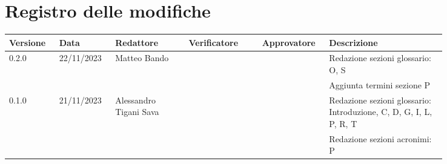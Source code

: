 \section*{Registro delle modifiche}
{
\renewcommand{\arraystretch}{1.5}
\scriptsize
\begin{longtable}{p{0.10\linewidth}p{0.10\linewidth}p{0.15\linewidth}p{0.15\linewidth}p{0.10\linewidth}p{0.24\linewidth}}
	\textbf{Versione} & \textbf{Data} & \textbf{Redattore}     & \textbf{Verificatore} & \textbf{Approvatore} & \textbf{Descrizione}	\\
	\toprule
	0.2.0	& 22/11/2023    & Matteo Bando			&	&	& Redazione sezioni glossario: O, S	\\
	&               &						&	&	& Aggiunta termini sezione P		\\
	\hline
	0.1.0	& 21/11/2023    & Alessandro Tigani Sava &	&	& Redazione sezioni glossario: Introduzione, C, D, G, I, L, P, R, T 	\\
			&               &						&	&	& Redazione sezioni acronimi: P		\\
	\bottomrule
\end{longtable}
}
